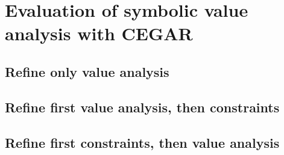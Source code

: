 \section{Evaluation of symbolic value analysis with CEGAR}
\subsection{Refine only value analysis}
\subsection{Refine first value analysis, then constraints}
\subsection{Refine first constraints, then value analysis}
